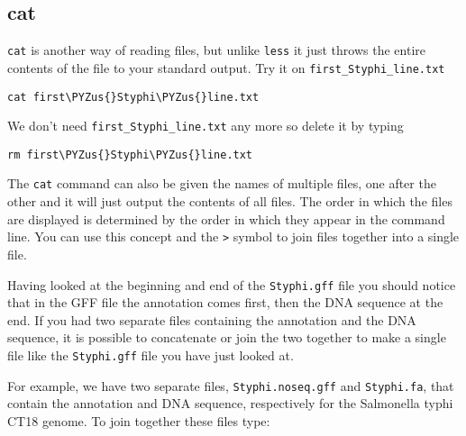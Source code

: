 \documentclass[11pt]{article}
\makeatletter
\def\PYZus{\char`\_}
\newcommand{\boxspacing}{\kern\kvtcb@left@rule\kern\kvtcb@boxsep}
\newcommand{\prompt}[4]{
        {\ttfamily\llap{{\color{blue}\LARGE\faKeyboardO\hspace{3pt}#4}}\vspace{-\baselineskip}}
    }
\makeatother
\begin{document}
    \hypertarget{cat}{%
\subsection{cat}\label{cat}}

\texttt{cat} is another way of reading files, but unlike \texttt{less}
it just throws the entire contents of the file to your standard output.
Try it on \texttt{first\_Styphi\_line.txt}

    \begin{tcolorbox}[breakable, size=fbox, boxrule=1pt, pad at break*=1mm,colback=cellbackground, colframe=cellborder]
\prompt{In}{incolor}{ }{\boxspacing}
\begin{Verbatim}[commandchars=\\\{\}]
cat first\PYZus{}Styphi\PYZus{}line.txt
\end{Verbatim}
\end{tcolorbox}

    We don't need \texttt{first\_Styphi\_line.txt} any more so delete it by
typing

    \begin{tcolorbox}[breakable, size=fbox, boxrule=1pt, pad at break*=1mm,colback=cellbackground, colframe=cellborder]
\prompt{In}{incolor}{ }{\boxspacing}
\begin{Verbatim}[commandchars=\\\{\}]
rm first\PYZus{}Styphi\PYZus{}line.txt
\end{Verbatim}
\end{tcolorbox}

    The \texttt{cat} command can also be given the names of multiple files,
one after the other and it will just output the contents of all files.
The order in which the files are displayed is determined by the order in
which they appear in the command line. You can use this concept and the
\texttt{\textgreater{}} symbol to join files together into a single
file.

Having looked at the beginning and end of the \texttt{Styphi.gff} file
you should notice that in the GFF file the annotation comes first, then
the DNA sequence at the end. If you had two separate files containing
the annotation and the DNA sequence, it is possible to concatenate or
join the two together to make a single file like the \texttt{Styphi.gff}
file you have just looked at.

For example, we have two separate files, \texttt{Styphi.noseq.gff} and
\texttt{Styphi.fa}, that contain the annotation and DNA sequence,
respectively for the Salmonella typhi CT18 genome. To join together
these files type:
\end{document}
